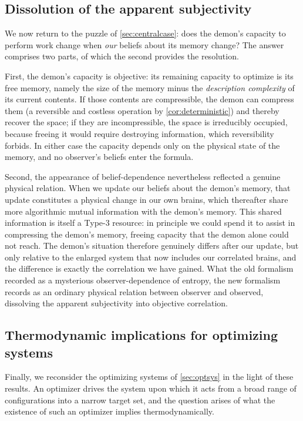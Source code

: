 \documentclass[11pt]{article}
\begin{document}
\subsection{Dissolution of the apparent subjectivity}
\label{sec:dissolve}

We now return to the puzzle of \cref{sec:centralcase}: does the demon's capacity to perform work change when \emph{our} beliefs about its memory change? The answer comprises two parts, of which the second provides the resolution.

First, the demon's capacity is objective: its remaining capacity to optimize is its free memory, namely the size of the memory minus the \emph{description complexity} of its current contents. If those contents are compressible, the demon can compress them (a reversible and costless operation by \cref{cor:deterministic}) and thereby recover the space; if they are incompressible, the space is irreducibly occupied, because freeing it would require destroying information, which reversibility forbids. In either case the capacity depends only on the physical state of the memory, and no observer's beliefs enter the formula.

Second, the appearance of belief-dependence nevertheless reflected a genuine physical relation. When we update our beliefs about the demon's memory, that update constitutes a physical change in our own brains, which thereafter share more algorithmic mutual information with the demon's memory. This shared information is itself a Type-3 resource: in principle we could spend it to assist in compressing the demon's memory, freeing capacity that the demon alone could not reach. The demon's situation therefore genuinely differs after our update, but only relative to the enlarged system that now includes our correlated brains, and the difference is exactly the correlation we have gained. What the old formalism recorded as a mysterious observer-dependence of entropy, the new formalism records as an ordinary physical relation between observer and observed, dissolving the apparent subjectivity into objective correlation.

\subsection{Thermodynamic implications for optimizing systems}
\label{sec:backtoflint}

Finally, we reconsider the optimizing systems of \cref{sec:optsys} in the light of these results. An optimizer drives the system upon which it acts from a broad range of configurations into a narrow target set, and the question arises of what the existence of such an optimizer implies thermodynamically.
\end{document}
